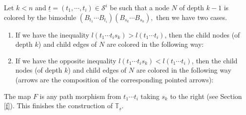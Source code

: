 \documentclass[12pt]{wart}
\theoremstyle{remark}
\begin{document}
\centerline{
}
\vspace{0.5cm}
Let $k<n$ and $\underline{t}=(t_1,  \cdots, t_{i})\in  \mathcal{S}^{i}$ be such that a node $N$ of depth $k-1$ is colored by the bimodule $(B_{t_1}  \cdots B_{t_{i}})(B_{s_{k}} \cdots B_{s_n}),$ then we have two cases.


\begin{enumerate}
\item If we have the inequality $l(t_1\cdots t_{i}s_k)>l(t_1\cdots t_{i})$, then the child nodes (of depth $k$)  and child edges of $N$ are colored in the following way:
\vspace{0.5cm}

 \centerline{
}
\item If we have the opposite inequality $l(t_1\cdots t_{i}s_k)<l(t_1\cdots t_{i})$, then the  child nodes (of depth $k$) and child edges of $N$ are colored in the following way (arrows are the composition of the corresponding pointed arrows):
 
 \vspace{0.5cm}
 \centerline{
}

\end{enumerate}
The map $F$ is any path morphism from ${t_1}  \cdots {t_{i}}$ taking $s_k$ to the right (see Section \ref{f}). This finishes the construction of $\mathbb{T}_{\underline{s}}.$
\end{document}
